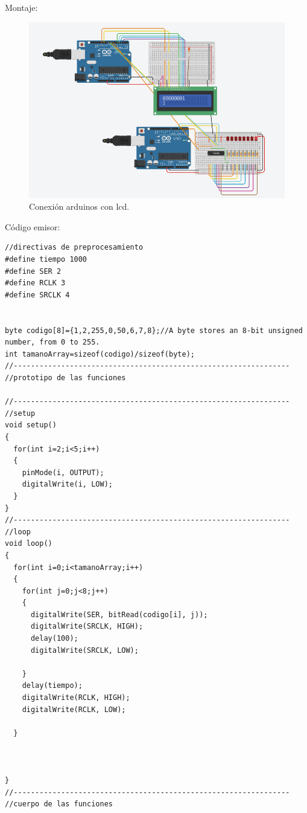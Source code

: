 \documentclass{article}
\begin{document}
Montaje:

\begin{figure}[h]
\includegraphics[scale=0.6]{implementacion lcd bin y dec.png}
\centering
\caption{Conexión arduinos con lcd.}
\label{fig:reemplazo pulsador por arduino}
\end{figure}

Código emisor:
\begin{lstlisting}[style=myArduino]
//directivas de preprocesamiento
#define tiempo 1000
#define SER 2
#define RCLK 3
#define SRCLK 4


byte codigo[8]={1,2,255,0,50,6,7,8};//A byte stores an 8-bit unsigned number, from 0 to 255.
int tamanoArray=sizeof(codigo)/sizeof(byte);
//----------------------------------------------------------------
//prototipo de las funciones

//----------------------------------------------------------------
//setup
void setup()
{
  for(int i=2;i<5;i++)
  {
    pinMode(i, OUTPUT);
    digitalWrite(i, LOW);
  }
}
//----------------------------------------------------------------
//loop
void loop()
{
  for(int i=0;i<tamanoArray;i++)
  {
    for(int j=0;j<8;j++)
    {
      digitalWrite(SER, bitRead(codigo[i], j));
      digitalWrite(SRCLK, HIGH);
      delay(100);
      digitalWrite(SRCLK, LOW);

    }
    delay(tiempo);
    digitalWrite(RCLK, HIGH);
    digitalWrite(RCLK, LOW);
    
  }
  
  
  
}
//----------------------------------------------------------------
//cuerpo de las funciones
\end{lstlisting}
\end{document}
